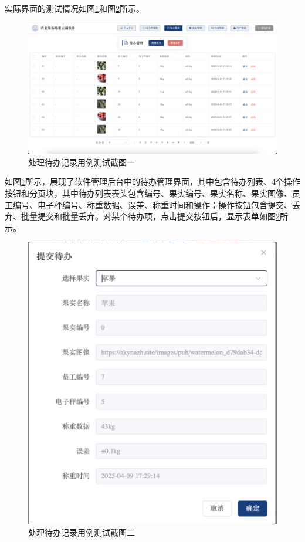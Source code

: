 实际界面的测试情况如图\ref{fig:todo-handle-result-1}和图\ref{fig:todo-handle-result-2}所示。

\begin{figure}[H]
    \centering
    \includegraphics[width=0.8\linewidth]{../result/todo-handle-result-1.png}
    \caption{处理待办记录用例测试截图一}
    \label{fig:todo-handle-result-1}
\end{figure}

如图\ref{fig:todo-handle-result-1}所示，展现了软件管理后台中的待办管理界面，其中包含待办列表、4个操作按钮和分页块，其中待办列表表头包含编号、果实编号、果实名称、果实图像、员工编号、电子秤编号、称重数据、误差、称重时间和操作；操作按钮包含提交、丢弃、批量提交和批量丢弃。对某个待办项，点击提交按钮后，显示表单如图\ref{fig:todo-handle-result-2}所示。

\begin{figure}[H]
    \centering
    \includegraphics[width=0.8\linewidth]{../result/todo-handle-result-2.png}
    \caption{处理待办记录用例测试截图二}
    \label{fig:todo-handle-result-2}
\end{figure}

